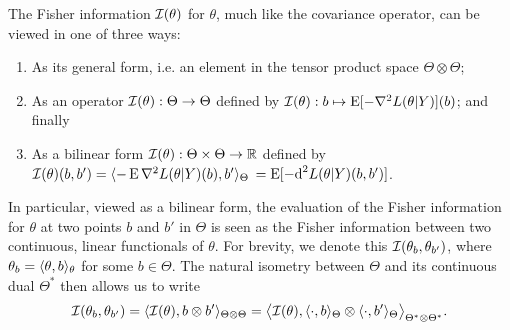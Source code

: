 The Fisher information ${\mathcal I}(\theta)$ for $\theta$, much like the covariance operator, can be viewed in one of three ways: 
\begin{enumerate}
  \item As its general form, i.e. an element in the tensor product space $\Theta\otimes\Theta$;
  \item As an operator ${\mathcal I}(\theta):\Theta\to\Theta$ defined by ${\mathcal I}(\theta): b \mapsto \operatorname{E}[- \nabla^2 L(\theta|Y)](b)$; and finally
  \item As a bilinear form ${\mathcal I}(\theta):\Theta\times\Theta\to\mathbb{R}$ defined by ${\mathcal I}(\theta)(b,b') = \langle-\operatorname{E} \nabla^2 L(\theta|Y)(b), b'\rangle_\Theta$ $= \operatorname{E} [-\text{d}^2 L(\theta|Y)(b,b') ]$.
\end{enumerate}
In particular, viewed as a bilinear form, the evaluation of the Fisher information for $\theta$ at two points $b$ and $b'$ in $\Theta$ is seen as the Fisher information between two continuous, linear functionals of $\theta$.
For brevity, we denote this ${\mathcal I}(\theta_b,\theta_{b'})$, where $\theta_b = \langle\theta,b\rangle_\theta$ for some $b\in\Theta$.
The natural isometry between $\Theta$ and its continuous dual $\Theta^*$ then allows us to write 
\begin{align}\label{eq:fisher-linear-functional}
  {\mathcal I}(\theta_b,\theta_{b'}) = \langle{\mathcal I}(\theta), b \otimes b'\rangle_{\Theta\otimes\Theta} = \big\langle{\mathcal I}(\theta), \langle\cdot,b\rangle_\Theta \otimes \langle\cdot,b'\rangle_\Theta \big\rangle_{\Theta^*\otimes\Theta^*}.
\end{align}


